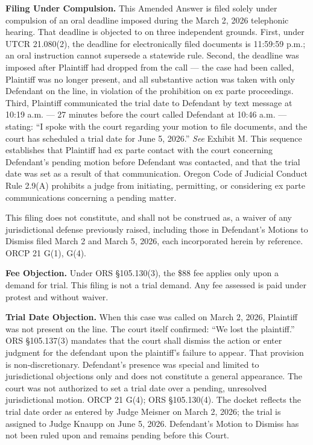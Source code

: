 \documentclass[12pt,letterpaper]{article}
\begin{document}
\textbf{Filing Under Compulsion.} This Amended Answer is filed solely under compulsion of an oral deadline imposed during the March 2, 2026 telephonic hearing. That deadline is objected to on three independent grounds. First, under UTCR 21.080(2), the deadline for electronically filed documents is 11:59:59 p.m.; an oral instruction cannot supersede a statewide rule. Second, the deadline was imposed after Plaintiff had dropped from the call --- the case had been called, Plaintiff was no longer present, and all substantive action was taken with only Defendant on the line, in violation of the prohibition on ex parte proceedings. Third, Plaintiff communicated the trial date to Defendant by text message at 10:19 a.m. --- 27 minutes before the court called Defendant at 10:46 a.m. --- stating: ``I spoke with the court regarding your motion to file documents, and the court has scheduled a trial date for June 5, 2026.'' \textit{See} Exhibit M. This sequence establishes that Plaintiff had ex parte contact with the court concerning Defendant's pending motion before Defendant was contacted, and that the trial date was set as a result of that communication. Oregon Code of Judicial Conduct Rule 2.9(A) prohibits a judge from initiating, permitting, or considering ex parte communications concerning a pending matter.

This filing does not constitute, and shall not be construed as, a waiver of any jurisdictional defense previously raised, including those in Defendant's Motions to Dismiss filed March 2 and March 5, 2026, each incorporated herein by reference. ORCP 21 G(1), G(4).

\textbf{Fee Objection.} Under ORS \S105.130(3), the \$88 fee applies only upon a demand for trial. This filing is not a trial demand. Any fee assessed is paid under protest and without waiver.

\textbf{Trial Date Objection.} When this case was called on March 2, 2026, Plaintiff was not present on the line. The court itself confirmed: ``We lost the plaintiff.'' ORS \S105.137(3) mandates that the court shall dismiss the action or enter judgment for the defendant upon the plaintiff's failure to appear. That provision is non-discretionary. Defendant's presence was special and limited to jurisdictional objections only and does not constitute a general appearance. The court was not authorized to set a trial date over a pending, unresolved jurisdictional motion. ORCP 21 G(4); ORS \S105.130(4). The docket reflects the trial date order as entered by Judge Meisner on March 2, 2026; the trial is assigned to Judge Knaupp on June 5, 2026. Defendant's Motion to Dismiss has not been ruled upon and remains pending before this Court.
\end{document}
